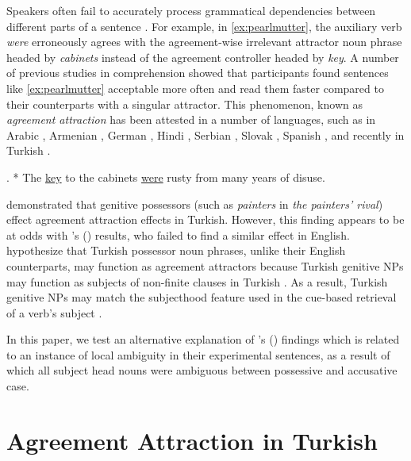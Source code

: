 \documentclass[]{interact}\usepackage[]{graphicx}\usepackage[]{color}
\theoremstyle{plain}%
\theoremstyle{definition}
\theoremstyle{remark}
\newcommand{\rev}[1]{{\color{red}#1}}
\begin{document}
Speakers often fail to accurately process grammatical dependencies between different parts of a sentence \citep[e.g.,][]{GibsonThomas:1999,PhillipsEtAl:2011}. For example, in \ref{ex:pearlmutter}, the auxiliary verb \textit{were} erroneously agrees with the agreement-wise irrelevant attractor noun phrase headed by \textit{cabinets} instead of the agreement controller headed by \textit{key}. A number of previous studies in comprehension \citep{NicolEtAl:1997, PearlmutterGarnseyBock:1999, WagersEtAl:2009} showed that participants found sentences like \ref{ex:pearlmutter} acceptable more often and read them faster compared to their counterparts with a singular attractor. This phenomenon, known as \textit{agreement attraction} \citep{BockMiller:1991} has been attested in a number of languages, such as in Arabic \citep{TuckerEtAl:2015}, Armenian \citep{AvetisyanEtAl:2020}, German \citep{LagoFelser:2018}, Hindi \citep{BhatiaDillon:2020}, Serbian \citep{RisticEtAl:2016}, Slovak \citep{BadeckerKuminiak:2007}, Spanish \citep{LagoEtAl:2015}, and recently in Turkish \citep{LagoEtAl:2019}.


\ex. \label{ex:pearlmutter} * The \underline{key} to the cabinets \underline{were} rusty from many years of disuse. 


\citet{LagoEtAl:2019} demonstrated that genitive possessors (such as \textit{painters} in \textit{the painters' rival}) effect agreement attraction effects in Turkish. However, this finding appears to be at odds with \citeauthor{NicolEtAl:2016}'s (\citeyear{NicolEtAl:2016}) results, who failed to find a similar effect in English. \citet{LagoEtAl:2019} hypothesize that Turkish possessor noun phrases, unlike their English counterparts, may function as agreement attractors because Turkish genitive NPs may function as subjects of non-finite clauses in Turkish \citep{GokselKerslake:2005,Kornfilt:2011}. As a result, Turkish genitive NPs may match the subjecthood feature used in the cue-based retrieval of a verb's subject \citep{LewisVasishth:2005, WagersEtAl:2009, ArnettWagers:2017}.

In this paper, we test an alternative explanation of \citeauthor{LagoEtAl:2019}'s (\citeyear{LagoEtAl:2019}) findings which is related to an instance of local ambiguity in \rev{their} experimental sentences, as a result of which all subject head nouns were ambiguous between possessive and accusative case.


\section{Agreement Attraction in Turkish}
\end{document}
